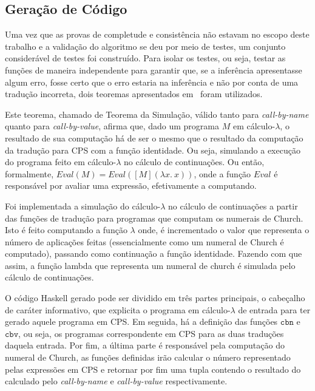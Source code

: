 \subsection{Geração de Código}\label{subsec:cps-code-gen}
Uma vez que as provas de completude e consistência não estavam no escopo deste trabalho e a validação do algoritmo se deu por meio de testes, um conjunto considerável de testes foi construído.
Para isolar os testes, ou seja, testar as funções de maneira independente para garantir que, se a inferência apresentasse algum erro, fosse certo que o erro estaria na inferência e não por conta de uma tradução incorreta, dois teoremas apresentados em~\cite{plotkin1975call} foram utilizados.

Este teorema, chamado de Teorema da Simulação, válido tanto para \textit{call-by-name} quanto para \textit{call-by-value}, afirma que, dado um programa $M$ em cálculo-$\lambda$, o resultado de sua computação há de ser o mesmo que o resultado da computação da tradução para CPS com a função identidade.
Ou seja, simulando a execução do programa feito em cálculo-$\lambda$ no cálculo de continuações.
Ou então, formalmente, $Eval(M) = Eval([M] (\lambda x.\ x))$, onde a função $Eval$ é responsável por avaliar uma expressão, efetivamente a computando.

Foi implementada a simulação do cálculo-$\lambda$ no cálculo de continuações a partir das funções de tradução para programas que computam os numerais de Church.
Isto é feito computando a função $\lambda$ onde, é incrementado o valor que representa o número de aplicações feitas (essencialmente como um numeral de Church é computado), passando como continuação a função identidade.
Fazendo com que assim, a função lambda que representa um numeral de church é simulada pelo cálculo de continuações.


O código Haskell gerado pode ser dividido em três partes principais, o cabeçalho de caráter informativo, que explicita o programa em cálculo-$\lambda$ de entrada para ter gerado aquele programa em CPS.
Em seguida, há a definição das funções $\mathtt{cbn}$ e $\mathtt{cbv}$, ou seja, os programas correspondente em CPS para as duas traduções daquela entrada.
Por fim, a última parte é responsável pela computação do numeral de Church, as funções definidas irão calcular o número representado pelas expressões em CPS e retornar por fim uma tupla contendo o resultado do calculado pelo \textit{call-by-name} e \textit{call-by-value} respectivamente.


